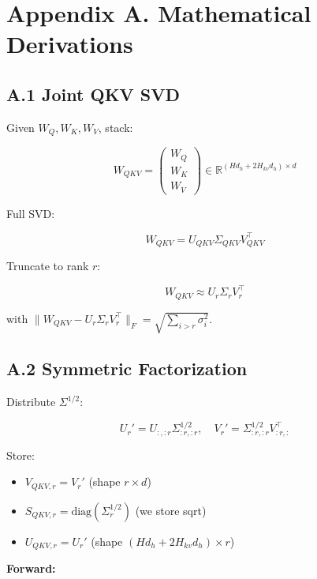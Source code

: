 \section{Appendix A. Mathematical Derivations}

\subsection{A.1 Joint QKV SVD}

Given $W_Q, W_K, W_V$, stack:

\begin{equation}
W_{QKV} = \begin{pmatrix} W_Q \\ W_K \\ W_V \end{pmatrix} \in \mathbb{R}^{(H d_h + 2 H_{kv} d_h) \times d}
\end{equation}

Full SVD:

\begin{equation}
W_{QKV} = U_{QKV} \Sigma_{QKV} V_{QKV}^\top
\end{equation}

Truncate to rank $r$:

\begin{equation}
W_{QKV} \approx U_r \Sigma_r V_r^\top
\end{equation}

with $\|W_{QKV} - U_r \Sigma_r V_r^\top\|_F = \sqrt{\sum_{i > r} \sigma_i^2}$.

\subsection{A.2 Symmetric Factorization}

Distribute $\Sigma^{1/2}$:

\begin{equation}
U_r' = U_{:, :r} \Sigma_{:r, :r}^{1/2}, \quad
V_r' = \Sigma_{:r, :r}^{1/2} V_{:r, :}^\top
\end{equation}

Store:
\begin{itemize}
\item $V_{QKV, r} = V_r'$ (shape $r \times d$)
\item $S_{QKV, r} = \text{diag}(\Sigma_r^{1/2})$ (we store sqrt)
\item $U_{QKV, r} = U_r'$ (shape $(H d_h + 2 H_{kv} d_h) \times r$)

\end{itemize}
\textbf{Forward:}

